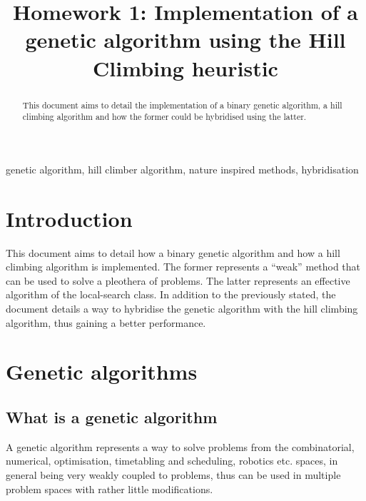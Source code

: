 \documentclass[conference]{IEEEtran}
\begin{document}
\title{Homework 1: Implementation of a genetic algorithm using the Hill Climbing heuristic}

\author{
}

\maketitle


\begin{abstract}
This document aims to detail the implementation of a binary genetic algorithm, a hill climbing algorithm
and how the former could be hybridised using the latter.
\end{abstract}

\begin{IEEEkeywords}
genetic algorithm, hill climber algorithm, nature inspired methods, hybridisation
\end{IEEEkeywords}

\section{Introduction}
This document aims to detail how a binary genetic algorithm and how a hill climbing algorithm is implemented.
The former represents a ``weak'' method that can be used to solve a pleothera of problems. The latter represents
an effective algorithm of the local-search class. In addition to the previously stated, the document details a
way to hybridise the genetic algorithm with the hill climbing algorithm, thus gaining a better performance.

\section{Genetic algorithms}

\subsection{What is a genetic algorithm}
A genetic algorithm represents a way to solve problems from the combinatorial, numerical, optimisation, timetabling and
scheduling, robotics etc. spaces, in general being very weakly coupled to problems, thus can be used in multiple
problem spaces with rather little modifications.
\end{document}
